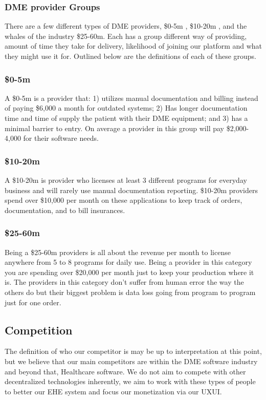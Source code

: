 \documentclass[12pt]{article}
\begin{document}
    \subsubsection{DME provider Groups}
    There are a few different types of DME providers, \$0-5m , \$10-20m , and the whales of the industry \$25-60m. Each has a group different way of providing, amount of time they take for delivery, likelihood of joining our platform and what they might use it for. Outlined below are the definitions of each of these groups.


    \subsubsection{\$0-5m}
    A \$0-5m is a provider that: 1) utilizes manual documentation and billing instead of paying \$6,000 a month for outdated systems; 2) Has longer documentation time and time of supply the patient with their DME equipment; and 3) has a minimal barrier to entry. On average a provider in this group will pay \$2,000-4,000 for their software needs.

    \subsubsection{\$10-20m}
    A \$10-20m is provider who licenses at least 3 different programs for everyday business and will rarely use manual documentation reporting. \$10-20m providers spend over \$10,000 per month on these applications to keep track of orders, documentation, and to bill insurances.

    \subsubsection{\$25-60m}
    Being a \$25-60m providers is all about the revenue per month to license anywhere from 5 to 8 programs for daily use. Being a provider in this category you are spending over \$20,000 per month just to keep your production where it is. The providers in this category don’t suffer from human error the way the others do but their biggest problem is data loss going from program to program just for one order.

  \subsection{Competition}
  The definition of who our competitor is may be up to interpretation at this point, but we believe that our main competitors are within the DME software industry and beyond that, Healthcare software. We do not aim to compete with other decentralized technologies inherently, we aim to work with these types of people to better our EHE system and focus our monetization via our UXUI.
\end{document}
